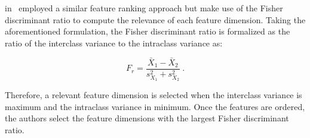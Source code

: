\citeauthor{Vos2012} in~\cite{Vos2012} employed a similar feature ranking approach but make use of the Fisher discriminant ratio to compute the relevance of each feature dimension.
Taking the aforementioned formulation, the Fisher discriminant ratio is formalized as the ratio of the interclass variance to the intraclass variance as:

\begin{equation}
F_r = \frac{\bar{X}_1 - \bar{X}_2}{s^{2}_{X_1}+s^{2}_{X_2}} \ .
\label{eq:fisherratio}
\end{equation}

Therefore, a relevant feature dimension is selected when the interclass variance is maximum and the intraclass variance in minimum.
Once the features are ordered, the authors select the feature dimensions with the largest Fisher discriminant ratio.

